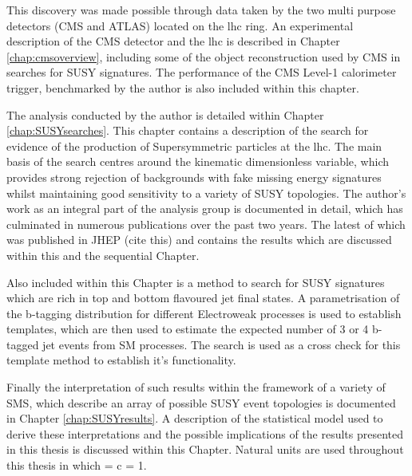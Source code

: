 This discovery was made possible through data taken by the two multi purpose detectors (\ac{CMS} and \ac{ATLAS}) located on the \ac{lhc} ring. An experimental description of the \ac{CMS} detector and the \ac{lhc} is described in Chapter \ref{chap:cmsoverview}, including some of the object reconstruction used by \ac{CMS} in searches for \ac{SUSY} signatures. The performance of the \ac{CMS} Level-1 calorimeter trigger, benchmarked by the author is also included within this chapter.

The analysis conducted by the author is detailed within Chapter \ref{chap:SUSYsearches}. This chapter contains a description of the search for evidence of the production of Supersymmetric particles at the \ac{lhc}. The main basis of the search centres around the kinematic dimensionless \alphat variable, which provides strong rejection of backgrounds with fake missing energy signatures whilst maintaining good sensitivity to a variety of \ac{SUSY} topologies. The author's work as an integral part of the analysis group is documented in detail, which has culminated in numerous publications over the past two years. The latest of which was published in JHEP (cite this) and contains the results which are discussed within this and the sequential Chapter.

Also included within this Chapter is a method to search for \ac{SUSY} signatures which are rich in top and bottom flavoured jet final states. A parametrisation of the b-tagging distribution for different Electroweak processes is used to establish templates, which are then used to estimate the expected number of 3 or 4 b-tagged jet events from \ac{SM} processes. The \alphat search is used as a cross check for this template method to establish it's functionality. 

Finally the interpretation of such results within the framework of a variety of \acf{SMS}, which describe an array of possible \ac{SUSY} event topologies is documented in Chapter \ref{chap:SUSYresults}. A description of the statistical model used to derive these interpretations and the possible implications of the results presented in this thesis is discussed within this Chapter. Natural units are used throughout this thesis in which \hbarred = c = 1.
